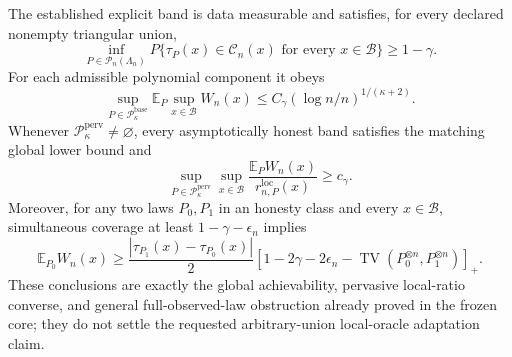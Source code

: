 The established explicit band is data measurable and satisfies, for every declared nonempty triangular union, \[\inf_{P\in\mathcal P_n(\Lambda_n)}P\{\tau_P(x)\in\mathcal C_n(x)\text{ for every }x\in\mathcal B\}\ge 1-\gamma.\] For each admissible polynomial component it obeys \[\sup_{P\in\mathcal P_{\kappa}^{\mathrm{base}}}\mathbb E_P\sup_{x\in\mathcal B}W_n(x)\le C_\gamma(\log n/n)^{1/(\kappa+2)}.\] Whenever \(\mathcal P_{\kappa}^{\mathrm{perv}}\neq\varnothing\), every asymptotically honest band satisfies the matching global lower bound and \[\sup_{P\in\mathcal P_{\kappa}^{\mathrm{perv}}}\sup_{x\in\mathcal B}\frac{\mathbb E_PW_n(x)}{r_{n,P}^{\mathrm{loc}}(x)}\ge c_\gamma.\] Moreover, for any two laws \(P_0,P_1\) in an honesty class and every \(x\in\mathcal B\), simultaneous coverage at least \(1-\gamma-\epsilon_n\) implies \[\mathbb E_{P_0}W_n(x)\ge\frac{|\tau_{P_1}(x)-\tau_{P_0}(x)|}{2}\left[1-2\gamma-2\epsilon_n-\operatorname{TV}(P_0^{\otimes n},P_1^{\otimes n})\right]_+.\] These conclusions are exactly the global achievability, pervasive local-ratio converse, and general full-observed-law obstruction already proved in the frozen core; they do not settle the requested arbitrary-union local-oracle adaptation claim.
